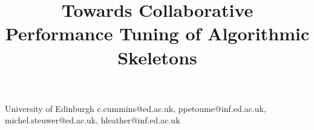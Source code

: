 \documentclass[nonatbib,preprint,9pt]{sigplanconf}
\begin{document}
\setlength{\pdfpageheight}{\paperheight}
\setlength{\pdfpagewidth}{\paperwidth}






\title{Towards Collaborative Performance Tuning of Algorithmic Skeletons}


           {University of Edinburgh}
           {c.cummins@ed.ac.uk, ppetoume@inf.ed.ac.uk, michel.steuwer@ed.ac.uk, hleather@inf.ed.ac.uk}

\maketitle
\end{document}
